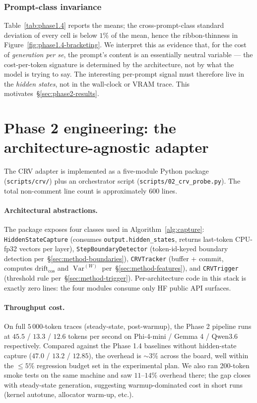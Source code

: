 \documentclass[11pt,letterpaper]{article}
\newcommand{\drift}{\mathrm{drift}_{\cos}}
\newcommand{\Var}{\operatorname{Var}}
\begin{document}
\subsubsection{Prompt-class invariance}

Table~\ref{tab:phase1.4} reports the means; the cross-prompt-class
standard deviation of every cell is below $1\%$ of the mean, hence the
ribbon-thinness in Figure~\ref{fig:phase1.4-bracketing}. We interpret
this as evidence that, for the cost of \emph{generation per se}, the
prompt's content is an essentially neutral variable — the cost-per-token
signature is determined by the architecture, not by what the model is
trying to say. The interesting per-prompt signal must therefore live in
the \emph{hidden states}, not in the wall-clock or VRAM trace.
This motivates~\S\ref{sec:phase2-results}.

\section{Phase 2 engineering: the architecture-agnostic adapter}
\label{sec:phase2-engineering}

The CRV adapter is implemented as a five-module Python package
(\texttt{scripts/crv/}) plus an orchestrator script
(\texttt{scripts/02\_crv\_probe.py}). The total non-comment line count
is approximately $600$ lines.

\paragraph{Architectural abstractions.}
The package exposes four classes used in
Algorithm~\ref{alg:capture}: \texttt{HiddenStateCapture} (consumes
\verb|output.hidden_states|, returns last-token CPU-fp32 vectors per
layer), \texttt{StepBoundaryDetector} (token-id-keyed boundary
detection per~\S\ref{sec:method-boundaries}), \texttt{CRVTracker}
(buffer + commit, computes $\drift$ and $\Var^{(W)}$
per~\S\ref{sec:method-features}), and \texttt{CRVTrigger}
(threshold rule per~\S\ref{sec:method-trigger}). Per-architecture code
in this stack is exactly zero lines: the four modules consume only HF
public API surfaces.

\paragraph{Throughput cost.}
On full $5\,000$-token traces (steady-state, post-warmup), the Phase 2
pipeline runs at $45.5$ / $13.3$ / $12.6$ tokens per second on
Phi-4-mini / Gemma 4 / Qwen3.6 respectively. Compared against the
Phase 1.4 baselines without hidden-state capture ($47.0$ / $13.2$ /
$12.85$), the overhead is $\sim 3\%$ across the board, well within
the $\le 5\%$ regression budget set in the experimental plan. We also
ran 200-token smoke tests on the same machine and saw $11$--$14\%$
overhead there; the gap closes with steady-state generation, suggesting
warmup-dominated cost in short runs (kernel autotune, allocator
warm-up, etc.).
\end{document}
